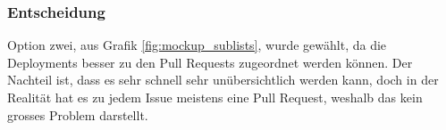 \subsubsection{Entscheidung}
Option zwei, aus Grafik \ref{fig:mockup_sublists}, wurde gewählt, da die Deployments besser zu den Pull Requests
zugeordnet werden können. Der Nachteil ist, dass es sehr schnell sehr unübersichtlich werden kann, doch in der Realität
hat es zu jedem Issue meistens eine Pull Request, weshalb das kein grosses Problem darstellt.
